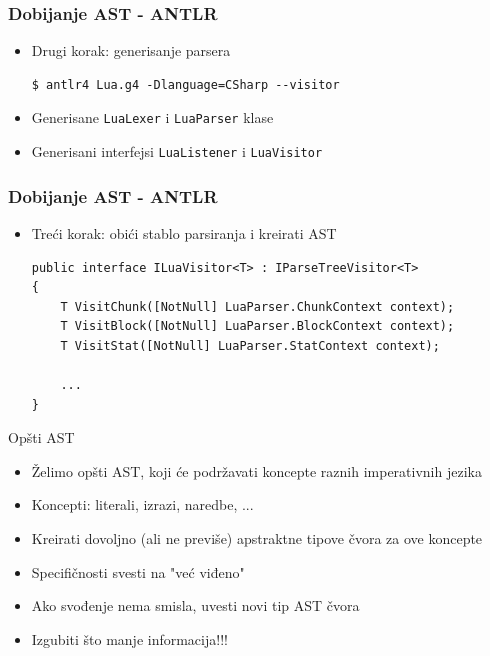 \documentclass{beamer}
\begin{document}
\begin{frame}[fragile]
    \frametitle{Dobijanje AST - ANTLR}
    \begin{itemize}
        \item Drugi korak: generisanje parsera
\begin{lstlisting}[language={}]
$ antlr4 Lua.g4 -Dlanguage=CSharp --visitor
\end{lstlisting}
        \item Generisane \texttt{LuaLexer} i \texttt{LuaParser} klase
        \item Generisani interfejsi  \texttt{LuaListener} i \texttt{LuaVisitor}
    \end{itemize}
\end{frame}

\begin{frame}[fragile]
    \frametitle{Dobijanje AST - ANTLR}
    \begin{itemize}
        \item Tre\'c{}i korak: obi\'c{}i stablo parsiranja i kreirati AST
\begin{lstlisting}
public interface ILuaVisitor<T> : IParseTreeVisitor<T>
{
    T VisitChunk([NotNull] LuaParser.ChunkContext context);
    T VisitBlock([NotNull] LuaParser.BlockContext context);
    T VisitStat([NotNull] LuaParser.StatContext context);
    
    ...
}
\end{lstlisting}
    \end{itemize}
\end{frame}

\begin{frame}{Op\v{s}ti AST}
    \begin{itemize}
        \item \v{Z}elimo op\v{s}ti AST, koji \'c{}e podr\v{z}avati koncepte raznih imperativnih jezika
        \item Koncepti: literali, izrazi, naredbe, ...
        \item Kreirati dovoljno (ali ne previ\v{s}e) apstraktne tipove \v{c}vora za ove koncepte
        \item Specifi\v{c}nosti svesti na "ve\'c{} viđeno"
        \item Ako svođenje nema smisla, uvesti novi tip AST \v{c}vora 
        \item Izgubiti \v{s}to manje informacija!!!
    \end{itemize}
\end{frame}
\end{document}
